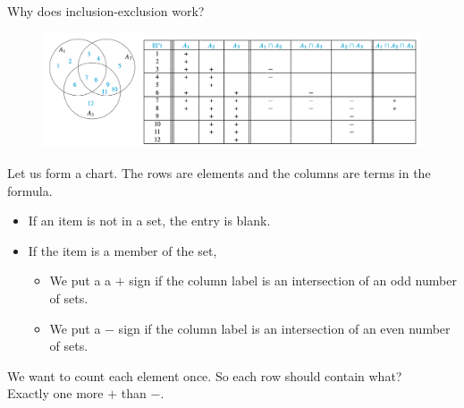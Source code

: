 \documentclass[10pt]{beamer}
\begin{document}
\begin{frame}{Why does inclusion-exclusion work?}
\footnotesize
\begin{figure}
\includegraphics[width=\textwidth]{images/inclusion_exclusion_proof}
\end{figure}

Let us form a chart.  The rows are elements and the columns are terms in the formula.
 
\begin{itemize}\footnotesize
\item If an item is not in a set, the entry is blank.
\item If the item is a member of the set, 
	\begin{itemize}\footnotesize 
	\item We put a a $+$ sign if the column label is an intersection of an odd number of sets.
	\item We put a $-$ sign if the column label is an intersection of an even number of sets.
	\end{itemize}
\end{itemize}

\vfill 

\begin{myyellowbox}[title=Poll]
We want to count each element once.  So each row should contain what? \\ 
 \pause Exactly one more $+$ than $-$.
\end{myyellowbox}
	
\end{frame}
\end{document}
